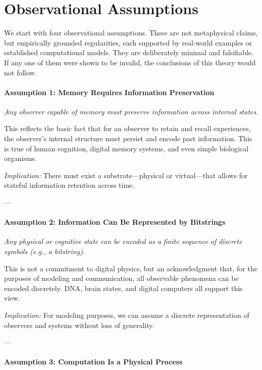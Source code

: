 \documentclass[12pt]{article}
\begin{document}
\section{Observational Assumptions}

We start with four observational assumptions. These are not metaphysical claims, but empirically grounded regularities, each supported by real-world examples or established computational models. They are deliberately minimal and falsifiable. If any one of them were shown to be invalid, the conclusions of this theory would not follow.

\paragraph{Assumption 1: Memory Requires Information Preservation}

\emph{Any observer capable of memory must preserve information across internal states.}

\vspace{0.2em}
This reflects the basic fact that for an observer to retain and recall experiences, the observer's internal structure must persist and encode past information. This is true of human cognition, digital memory systems, and even simple biological organisms.

\emph{Implication:} There must exist a substrate—physical or virtual—that allows for stateful information retention across time.

---

\paragraph{Assumption 2: Information Can Be Represented by Bitstrings}

\emph{Any physical or cognitive state can be encoded as a finite sequence of discrete symbols (e.g., a bitstring).}

\vspace{0.2em}
This is not a commitment to digital physics, but an acknowledgment that, for the purposes of modeling and communication, all observable phenomena can be encoded discretely. DNA, brain states, and digital computers all support this view.

\emph{Implication:} For modeling purposes, we can assume a discrete representation of observers and systems without loss of generality.

---

\paragraph{Assumption 3: Computation Is a Physical Process}
\end{document}
